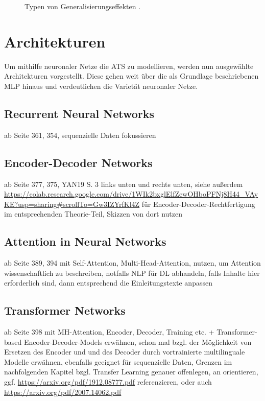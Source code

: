 \begin{figure}[h!]
  \centering
  \caption{Typen von Generalisierungseffekten \cite{EDPOJ}.}
  \label{pic:FittingTypes}
\end{figure}


\section{Architekturen}
\noindent
Um mithilfe neuronaler Netze die \ac{ATS} zu modellieren, werden nun ausgewählte Architekturen vorgestellt. Diese gehen weit über die als Grundlage beschriebenen \ac{MLP} hinaus und verdeutlichen die Varietät neuronaler Netze. 


\subsection{Recurrent Neural Networks}
\noindent
\cite{ZHA20} ab Seite 361, 354, sequenzielle Daten fokussieren


\subsection{Encoder-Decoder Networks}
\noindent
\cite{ZHA20} ab Seite 377, 375, YAN19 S. 3 links unten und rechts unten, siehe außerdem \url{https://colab.research.google.com/drive/1WIk2bxglElfZewOHboPFNj8H44_VAyKE?usp=sharing#scrollTo=Gw3IZYrfKl4Z} für Encoder-Decoder-Rechtfertigung im entsprechenden Theorie-Teil, Skizzen von dort nutzen


\subsection{Attention in Neural Networks}
\noindent
\cite{ZHA20} ab Seite 389, 394 mit Self-Attention, Multi-Head-Attention, \cite{VAS17} nutzen, um Attention wissenschaftlich zu beschreiben, notfalls NLP für DL abhandeln, falls Inhalte hier erforderlich sind, dann entsprechend die Einleitungstexte anpassen


\subsection{Transformer Networks}
\noindent
\cite{ZHA20} ab Seite 398 mit MH-Attention, Encoder, Decoder, Training etc. + Transformer-based Encoder-Decoder-Models erwähnen, schon mal \cite{ROT20} bzgl. der Möglichkeit von Ersetzen des Encoder und und des Decoder durch vortrainierte multilinguale Modelle erwähnen, ebenfalls geeignet für sequenzielle Daten, Grenzen im nachfolgenden Kapitel bzgl. Transfer Learning genauer offenlegen, an \cite{RAF20} orientieren, ggf. \url{https://arxiv.org/pdf/1912.08777.pdf} referenzieren, oder auch \url{https://arxiv.org/pdf/2007.14062.pdf}


